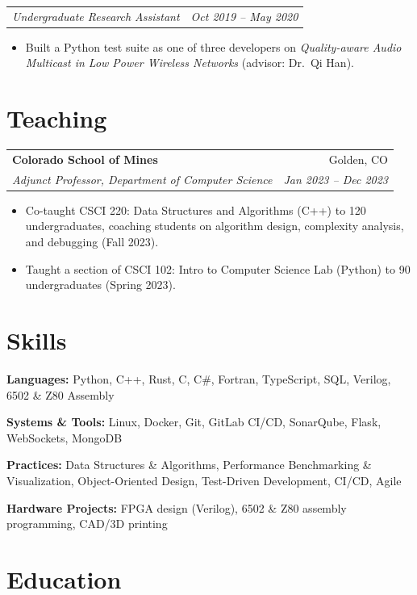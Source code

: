 \documentclass[letterpaper,10pt]{article}
\makeatletter
\newcommand{\entry}[4]{%
  \begin{tabularx}{\linewidth}{@{}X r@{}}
    \textbf{#1} & #2 \\
    \textit{#3} & \textit{\small #4} \\
  \end{tabularx}\vspace{-2pt}%
}
\newcommand{\subentry}[2]{%
  \begin{tabularx}{\linewidth}{@{}X r@{}}
    \textit{#1} & \textit{\small #2} \\
  \end{tabularx}\vspace{-2pt}%
}
\newcommand{\skillrow}[2]{\textbf{#1:} #2\par\vspace{1pt}}
\makeatother
\begin{document}
\subentry{Undergraduate Research Assistant}{Oct 2019 -- May 2020}
\begin{itemize}
  \item Built a Python test suite as one of three developers on \textit{Quality-aware Audio Multicast in Low Power
        Wireless Networks} (advisor: Dr.\ Qi Han).
\end{itemize}

\section{Teaching}

\entry{Colorado School of Mines}{Golden, CO}{Adjunct Professor, Department of Computer Science}{Jan 2023 -- Dec 2023}
\begin{itemize}
  \item Co-taught CSCI 220: Data Structures and Algorithms (C++) to 120 undergraduates, coaching students on
        algorithm design, complexity analysis, and debugging (Fall 2023).
  \item Taught a section of CSCI 102: Intro to Computer Science Lab (Python) to 90 undergraduates (Spring 2023).
\end{itemize}

\section{Skills}
\skillrow{Languages}{Python, C++, Rust, C, C\#, Fortran, TypeScript, SQL, Verilog, 6502 \& Z80 Assembly}
\skillrow{Systems \& Tools}{Linux, Docker, Git, GitLab CI/CD, SonarQube, Flask, WebSockets, MongoDB}
\skillrow{Practices}{Data Structures \& Algorithms, Performance Benchmarking \& Visualization, Object-Oriented Design,
  Test-Driven Development, CI/CD, Agile}
\skillrow{Hardware Projects}{FPGA design (Verilog), 6502 \& Z80 assembly programming, CAD/3D printing}

\section{Education}
\end{document}
